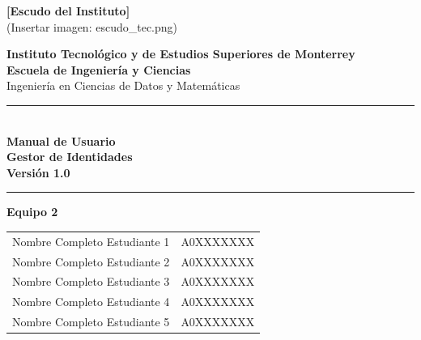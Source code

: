 \documentclass[10pt,letterpaper]{report}
\begin{document}
\begin{titlepage}
  \centering


  \vspace{1cm}
  {\Large\bfseries\color{itesmblue} [Escudo del Instituto]}\\[0.3cm]
  {\small\color{graytext} (Insertar imagen: escudo\_tec.png)}

  \vspace{1.2cm}

  {\Large\bfseries\color{itesmblue}
    Instituto Tecnológico y de Estudios Superiores de Monterrey}\\[0.6cm]

  {\large\bfseries Escuela de Ingeniería y Ciencias}\\[0.3cm]

  {\large Ingeniería en Ciencias de Datos y Matemáticas}\\[1.5cm]

  \rule{\textwidth}{1.5pt}\\[0.5cm]
  {\LARGE\bfseries\color{darktext}
    Manual de Usuario\\[0.2cm]
    Gestor de Identidades\\[0.2cm]
    Versión 1.0}\\[0.5cm]
  \rule{\textwidth}{1.5pt}

  \vspace{1.5cm}

  {\large\bfseries Equipo 2}\\[0.4cm]
  \begin{tabular}{l l}
    Nombre Completo Estudiante 1 & A0XXXXXXX \\
    Nombre Completo Estudiante 2 & A0XXXXXXX \\
    Nombre Completo Estudiante 3 & A0XXXXXXX \\
    Nombre Completo Estudiante 4 & A0XXXXXXX \\
    Nombre Completo Estudiante 5 & A0XXXXXXX \\
  \end{tabular}

  \vspace{0.8cm}


\end{titlepage}
\end{document}
